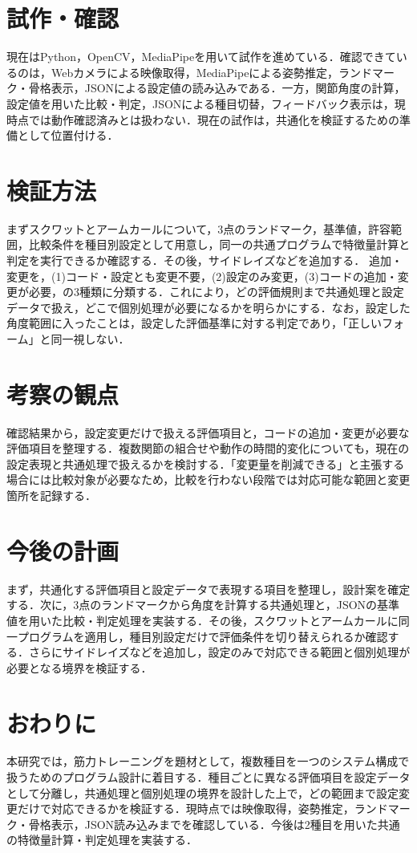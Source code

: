 \documentclass[no-page-number]{nanzan-abstract}
\begin{document}
\section{試作・確認}
現在はPython，OpenCV，MediaPipeを用いて試作を進めている．確認できているのは，Webカメラによる映像取得，MediaPipeによる姿勢推定，ランドマーク・骨格表示，JSONによる設定値の読み込みである．一方，関節角度の計算，設定値を用いた比較・判定，JSONによる種目切替，フィードバック表示は，現時点では動作確認済みとは扱わない．現在の試作は，共通化を検証するための準備として位置付ける．

\section{検証方法}
まずスクワットとアームカールについて，3点のランドマーク，基準値，許容範囲，比較条件を種目別設定として用意し，同一の共通プログラムで特徴量計算と判定を実行できるか確認する．その後，サイドレイズなどを追加する．
追加・変更を，(1)コード・設定とも変更不要，(2)設定のみ変更，(3)コードの追加・変更が必要，の3種類に分類する．これにより，どの評価規則まで共通処理と設定データで扱え，どこで個別処理が必要になるかを明らかにする．なお，設定した角度範囲に入ったことは，設定した評価基準に対する判定であり，「正しいフォーム」と同一視しない．

\section{考察の観点}
確認結果から，設定変更だけで扱える評価項目と，コードの追加・変更が必要な評価項目を整理する．複数関節の組合せや動作の時間的変化についても，現在の設定表現と共通処理で扱えるかを検討する．「変更量を削減できる」と主張する場合には比較対象が必要なため，比較を行わない段階では対応可能な範囲と変更箇所を記録する．

\section{今後の計画}
まず，共通化する評価項目と設定データで表現する項目を整理し，設計案を確定する．次に，3点のランドマークから角度を計算する共通処理と，JSONの基準値を用いた比較・判定処理を実装する．その後，スクワットとアームカールに同一プログラムを適用し，種目別設定だけで評価条件を切り替えられるか確認する．さらにサイドレイズなどを追加し，設定のみで対応できる範囲と個別処理が必要となる境界を検証する．

\section{おわりに}
本研究では，筋力トレーニングを題材として，複数種目を一つのシステム構成で扱うためのプログラム設計に着目する．種目ごとに異なる評価項目を設定データとして分離し，共通処理と個別処理の境界を設計した上で，どの範囲まで設定変更だけで対応できるかを検証する．現時点では映像取得，姿勢推定，ランドマーク・骨格表示，JSON読み込みまでを確認している．今後は2種目を用いた共通の特徴量計算・判定処理を実装する．
\end{document}
